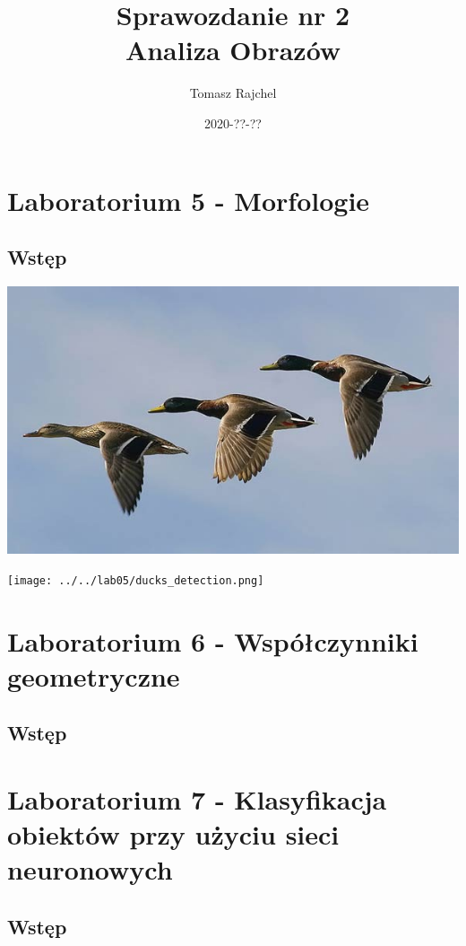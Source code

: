 \documentclass{article}
\title{Sprawozdanie nr 2\\Analiza Obrazów}
\date{2020-??-??}
\author{Tomasz Rajchel}
\begin{document}
	\maketitle

	\tableofcontents
	\newpage
	
	\section{Laboratorium 5 - Morfologie}
	\subsection{Wstęp}
		\begin{center}
		\includegraphics[width=\linewidth]{../../pictures/kaczki.jpg}
	\end{center}

	\begin{center}
		\texttt{[image: ../../lab05/ducks\_detection.png]}
		\label{fig:cat_gray}
	\end{center}
	
	\section{Laboratorium 6 - Współczynniki geometryczne}
	\subsection{Wstęp}
	
	\section{Laboratorium 7 - Klasyfikacja obiektów przy użyciu sieci neuronowych}
	\subsection{Wstęp}
	
\end{document}
